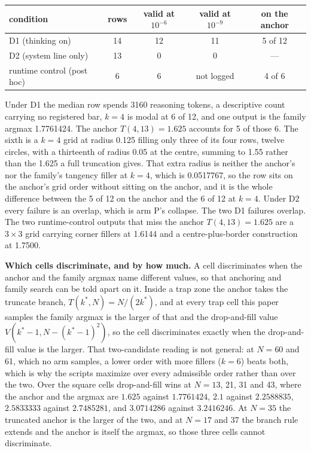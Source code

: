 \begin{center}
\begin{small}
\begin{tabular}{@{}lcccc@{}}
\toprule
condition & rows & valid at $10^{-6}$ & valid at $10^{-9}$ & on the anchor \\
\midrule
D1 (thinking on) & 14 & 12 & 11 & 5 of 12 \\
D2 (system line only) & 13 & 0 & 0 & --- \\
runtime control (post hoc) & 6 & 6 & not logged & 4 of 6 \\
\bottomrule
\end{tabular}
\end{small}
\end{center}

Under D1 the median row spends 3160 reasoning tokens, a descriptive count carrying no
registered bar, $k = 4$ is modal at 6 of 12, and one
output is the family argmax 1.7761424. The anchor $T(4,13) = 1.625$ accounts for 5 of
those 6. The sixth is a $k = 4$ grid at radius 0.125 filling only three of its four rows,
twelve circles, with a thirteenth of radius 0.05 at the centre, summing to 1.55 rather than
the 1.625 a full truncation gives. That extra radius is neither the anchor's nor the family's
tangency filler at $k = 4$, which is 0.0517767, so the row sits on the anchor's grid order
without sitting on the anchor, and it is the whole difference between the 5 of 12 on the
anchor and the 6 of 12 at $k = 4$. Under D2 every failure is an overlap, which is arm P's
collapse. The two D1 failures overlap. The two runtime-control outputs that miss
the anchor $T(4,13) = 1.625$ are a $3 \times 3$ grid carrying corner
fillers at 1.6144 and a centre-plus-border construction at 1.7500.

\textbf{Which cells discriminate, and by how much.} A cell discriminates when the
anchor and the family argmax name different values, so that anchoring and family search
can be told apart on it. Inside a trap zone the anchor takes the truncate branch,
$T(k^*, N) = N/(2k^*)$, and at every trap cell this paper samples the family argmax is the
larger of that and the drop-and-fill value $V(k^*{-}1, N - (k^*{-}1)^2)$, so the cell
discriminates exactly when the drop-and-fill value is the larger. That two-candidate reading
is not general: at $N = 60$ and 61, which no arm samples, a lower order with more fillers
($k = 6$) beats both, which is why the scripts maximize over every admissible order rather
than over the two. Over the square cells drop-and-fill wins at $N = 13$, 21, 31 and 43, where the
anchor and the argmax are $1.625$ against $1.7761424$, $2.1$ against $2.2588835$, $2.5833333$
against $2.7485281$, and $3.0714286$ against $3.2416246$. At $N = 35$ the truncated anchor is
the larger of the two, and at $N = 17$ and 37 the branch rule extends and the anchor is
itself the argmax, so those three cells cannot discriminate.

